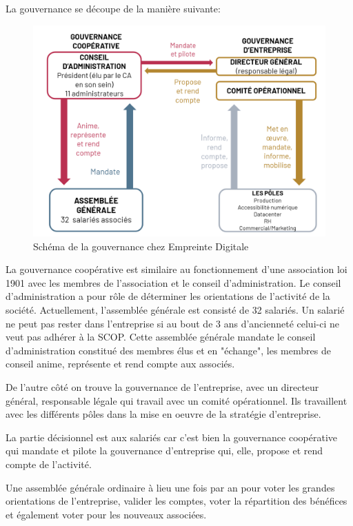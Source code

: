 \documentclass[12pt]{article}
\begin{document}
\newpage
La gouvernance se découpe de la manière suivante:
\begin{figure}[!ht]
    \centering
    \includegraphics[width=\textwidth]{src/scheme_scop_ed.png}
    \caption{Schéma de la gouvernance chez Empreinte Digitale}
    \label{fig:gouvernance_ed}
\end{figure}

La gouvernance coopérative est similaire au fonctionnement d'une association loi 1901 avec les membres de l'association et le conseil d'administration. 
Le conseil d'administration a pour rôle de déterminer les orientations de l'activité de la société. 
Actuellement, l'assemblée générale est consisté de 32 salariés. 
Un salarié ne peut pas rester dans l'entreprise si au bout de 3 ans d'ancienneté celui-ci ne veut pas adhérer à la \gls{SCOP}. 
Cette assemblée générale mandate le conseil d'administration constitué des membres élus et en "échange", les membres de conseil anime, représente et rend compte aux associés.

De l'autre côté on trouve la gouvernance de l'entreprise, avec un directeur général, responsable légale qui travail avec un comité opérationnel. 
Ils travaillent avec les différents pôles dans la mise en oeuvre de la stratégie d'entreprise.

La partie décisionnel est aux salariés car c'est bien la gouvernance coopérative qui mandate et pilote la gouvernance d'entreprise qui, elle, propose et rend compte de l'activité.

Une assemblée générale ordinaire à lieu une fois par an pour voter les grandes orientations de l'entreprise, valider les comptes, voter la répartition des bénéfices et également voter pour les nouveaux associées.
\end{document}

